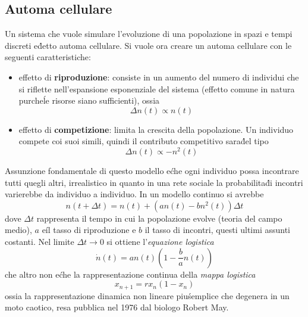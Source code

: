\documentclass[12pt, a4paper]{book}
\theoremstyle{theorem}
\begin{document}
			\subsection{Automa cellulare}
				Un sistema che vuole simulare l'evoluzione di una popolazione in spazi e tempi discreti e\' detto automa cellulare.
				Si vuole ora creare un automa cellulare con le seguenti caratteristiche:
				\begin{itemize}
					\item effetto di \textbf{riproduzione}: consiste in un aumento del numero di individui che si riflette nell'espansione esponenziale del sistema (effetto comune in natura purche\' le risorse siano sufficienti), ossia
						\begin{equation*}
							\Delta n(t) \propto n(t)
						\end{equation*}
					\item effetto di \textbf{competizione}: limita la crescita della popolazione.
						Un individuo compete coi suoi simili, quindi il contributo competitivo sara\' del tipo
						\begin{equation*}
							\Delta n(t) \propto -n^2(t)
						\end{equation*}
				\end{itemize}
				Assunzione fondamentale di questo modello e\' che ogni individuo possa incontrare tutti quegli altri, irrealistico in quanto in una rete sociale la probabilita\' di incontri varierebbe da individuo a individuo.
				In un modello continuo si avrebbe
				\begin{equation*}
					n\left(t+\Delta t\right)=n(t)+\left(an(t)-bn^2(t)\right)\Delta t
				\end{equation*}
				dove $\Delta t$ rappresenta il tempo in cui la popolazione evolve (teoria del campo medio), $a$ e\' il tasso di riproduzione e $b$ il tasso di incontri, questi ultimi assunti costanti.
				Nel limite $\Delta t\to 0$ si ottiene l'\emph{equazione logistica}
				\begin{equation}
					\dot{n}(t)=an(t)\left(1-\frac{b}{a}n(t)\right)
					\label{equation:equazione_logistica}
				\end{equation}
				che altro non e\' che la rappresentazione continua della \emph{mappa logistica}
				\begin{equation}
					x_{n+1}=rx_{n}\left(1-x_n\right)
					\label{equation:mappa_logistica}
				\end{equation}
				ossia la rappresentazione dinamica non lineare piu\' semplice che degenera in un moto caotico, resa pubblica nel 1976 dal biologo Robert May.\\
\end{document}

